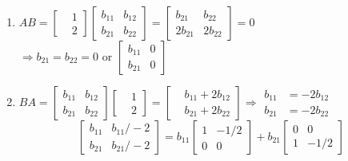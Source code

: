\documentclass[twoside]{amsart}
\theoremstyle{plain}
\theoremstyle{definition}
\begin{document}
\begin{enumerate}
  \item $AB = \left[ \begin{matrix} & 1 \\ & 2 \end{matrix} \right] \left[ \begin{matrix} b_{11} & b_{12} \\ b_{21} & b_{22} \end{matrix} \right] = \left[ \begin{matrix} b_{21} & b_{22} \\ 2b_{21} & 2b_{22} \end{matrix} \right] = 0 $ \\
   $\Longrightarrow b_{21} = b_{22} =0$ or $\left[ \begin{matrix} b_{11} & 0 \\ b_{21} & 0 \end{matrix} \right]$
  \item $BA = \left[ \begin{matrix} b_{11} & b_{12} \\ b_{21} & b_{22} \end{matrix} \right]\left[ \begin{matrix} & 1 \\ & 2 \end{matrix} \right] = \left[ \begin{matrix} & b_{11} + 2b_{12} \\ & b_{21} + 2b_{22} \end{matrix} \right] \Longrightarrow \begin{aligned}
b_{11} & = -2b_{12} \\
b_{21} & = -2b_{22}
\end{aligned}$
\[
\left[ \begin{matrix} b_{11} & b_{11}/-2 \\ b_{21} & b_{21}/-2 \end{matrix} \right] = b_{11} \left[ \begin{matrix} 1 & -1/2 \\ 0 & 0 \end{matrix} \right] + b_{21} \left[ \begin{matrix} 0 & 0 \\ 1 & -1/2 \end{matrix} \right]
\]
\end{enumerate}
\end{document}
